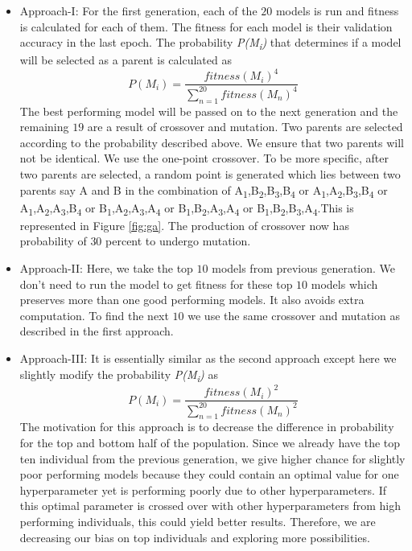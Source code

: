 \documentclass[conference]{IEEEtran}
\begin{document}
\begin{enumerate}
\begin{itemize}
\item Approach-I: For the first generation, each of the $20$ models is run and fitness is calculated for each of them. The fitness for each model is their validation accuracy in the last epoch. The probability \textit{P(M\textsubscript{i})} that determines if a model will be selected as a parent is calculated as
\[
    P(M_i) = \frac{fitness(M_i)^4}{\sum_{n=1}^{20} fitness(M_n)^4}
\] 
The best performing model will be passed on to the next generation and the remaining $19$ are a result of crossover and mutation. Two parents are selected according to the probability described above. We ensure that two parents will not be identical. We use the one-point crossover.
To be more specific, after two parents are selected, a random point is generated which lies between two parents say A and B in the combination of A\textsubscript{1},B\textsubscript{2},B\textsubscript{3},B\textsubscript{4} or A\textsubscript{1},A\textsubscript{2},B\textsubscript{3},B\textsubscript{4} or A\textsubscript{1},A\textsubscript{2},A\textsubscript{3},B\textsubscript{4} or B\textsubscript{1},A\textsubscript{2},A\textsubscript{3},A\textsubscript{4} or B\textsubscript{1},B\textsubscript{2},A\textsubscript{3},A\textsubscript{4} or B\textsubscript{1},B\textsubscript{2},B\textsubscript{3},A\textsubscript{4}.This is represented in Figure \ref{fig:ga}. The production of crossover now has probability of $30$ percent to undergo mutation.

\item Approach-II: Here, we take the top $10$ models from previous generation. We don't need to run the model to get fitness for these top $10$ models which preserves more than one good performing models. It also avoids extra computation. To find the next $10$ we use the same crossover and mutation as described in the first approach.

\item Approach-III: It is essentially similar as the second approach except here we slightly modify the probability \textit{P(M\textsubscript{i})} as \[
    P(M_i) = \frac{fitness(M_i)^2}{\sum_{n=1}^{20} fitness(M_n)^2}
\] The motivation for this approach is to decrease the difference in probability for the top and bottom half of the population. Since we already have the top ten individual from the previous generation, we give higher chance for slightly poor performing models because they could contain an optimal value for one hyperparameter yet is performing poorly due to other hyperparameters. If this optimal parameter is crossed over with other hyperparameters from high performing individuals, this could yield better results. Therefore, we are decreasing our bias on top individuals and exploring more possibilities.

\end{itemize}

\end{enumerate}
\end{document}
